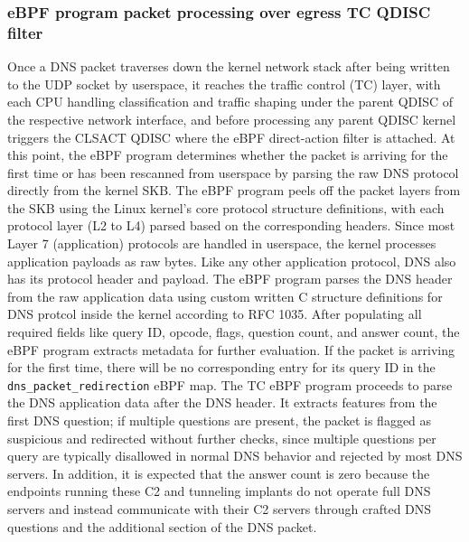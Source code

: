 \documentclass [11pt, proquest] {uwthesis}[2020/02/24]
\begin{document}
\subsubsection{\textbf{eBPF program packet processing over egress TC QDISC filter}}
\label{active:sec1}
\label{sec:alg1}  
Once a DNS packet traverses down the kernel network stack after being written to the UDP socket by userspace, it reaches the traffic control (TC) layer, with each CPU handling classification and traffic shaping under the parent QDISC of the respective network interface, and before processing any parent QDISC kernel triggers the CLSACT QDISC where the eBPF direct-action filter is attached. At this point, the eBPF program determines whether the packet is arriving for the first time or has been rescanned from userspace by parsing the raw DNS protocol directly from the kernel SKB. The eBPF program peels off the packet layers from the SKB using the Linux kernel’s core protocol structure definitions, with each protocol layer (L2 to L4) parsed based on the corresponding headers. Since most Layer 7 (application) protocols are handled in userspace, the kernel processes application payloads as raw bytes. Like any other application protocol, DNS also has its protocol header and payload. The eBPF program parses the DNS header from the raw application data using custom written C structure definitions for DNS protcol inside the kernel according to RFC 1035. After populating all required fields like query ID, opcode, flags, question count, and answer count, the eBPF program extracts metadata for further evaluation. If the packet is arriving for the first time, there will be no corresponding entry for its query ID in the \texttt{dns\_packet\_redirection} eBPF map. The TC eBPF program proceeds to parse the DNS application data after the DNS header. It extracts features from the first DNS question; if multiple questions are present, the packet is flagged as suspicious and redirected without further checks, since multiple questions per query are typically disallowed in normal DNS behavior and rejected by most DNS servers. In addition, it is expected that the answer count is zero because the endpoints running these C2 and tunneling implants do not operate full DNS servers and instead communicate with their C2 servers through crafted DNS questions and the additional section of the DNS packet.
\end{document}

